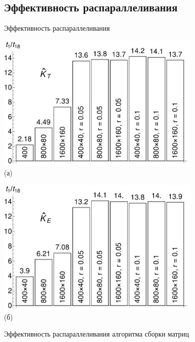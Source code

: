 \subsection{Эффективность распараллеливания}
\begin{frame}{Эффективность распараллеливания}
	\begin{minipage}{0.49\textwidth}
		\centering
		\includegraphics[width=0.75\textwidth]{pics/OMPThermal.pdf} \\
		(а)
	\end{minipage}
	\begin{minipage}{0.49\textwidth}
		\centering
		\includegraphics[width=0.75\textwidth]{pics/OMPMechanical.pdf} \\
		(б)
	\end{minipage}
	\begin{center}
		Эффективность распараллеливания алгоритма сборки матриц
	\end{center}
	

\end{frame}
